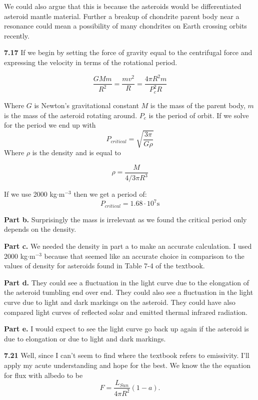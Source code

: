 \documentclass[12pt, leqno]{article}
\begin{document}
We could also argue that this is because the asteroids would be differentiated asteroid mantle material. Further a breakup of chondrite parent body near a resonance could mean a possibility of many chondrites on Earth crossing orbits recently. 

\bigskip

\noindent \textbf{7.17}
If we begin by setting the force of gravity equal to the centrifugal force and expressing the velocity in terms of the rotational period. 

$$ 
\frac{GMm}{R^2} = \frac{mv^2}{R} = \frac{4 \pi R^2 m}{P_c^2 R}
$$

\noindent Where $G$ is Newton's gravitational constant $M$ is the mass of the parent body, $m$ is the mass of the asteroid rotating around. $P_c$ is the period of orbit. If we solve for the period we end up with 
$$
P_{critical} = \sqrt{\frac{3 \pi}{G \rho}}
$$ 
Where $\rho$ is the density and is equal to 

$$
\rho = \frac{M}{4/3 \pi R^3}
$$

\noindent If we use 2000 kg$\cdot \mathrm{m}^{-3}$ then we get a period of: 
$$ 
P_{critical} = 1.68 \cdot 10^7 \mathrm{s}
$$

\noindent \textbf{Part b.} 
Surprisingly the mass is irrelevant as we found the critical period only depends on the density. 

\noindent \textbf{Part c.}
We needed the density in part a to make an accurate calculation. I used 2000 kg$\cdot\mathrm{m}^{-3}$ because that seemed like an accurate choice in comparison to the values of density for asteroids found in Table 7-4 of the textbook. 

\noindent \textbf{Part d.}
They could see a fluctuation in the light curve due to the elongation of the asteroid tumbling end over end. They could also see a fluctuation in the light curve due to light and dark markings on the asteroid. They could have also compared light curves of reflected solar and emitted thermal infrared radiation. 

\noindent \textbf{Part e.}
I would expect to see the light curve go back up again if the asteroid is due to elongation or due to light and dark markings. 

\bigskip

\noindent \textbf{7.21}
Well, since I can't seem to find where the textbook refers to emissivity. I'll apply my acute understanding and hope for the best. We know the the equation for flux with albedo to be 
$$ 
F = \frac{L_{Sun}}{4 \pi R^2} (1-a). 
$$
\end{document}
